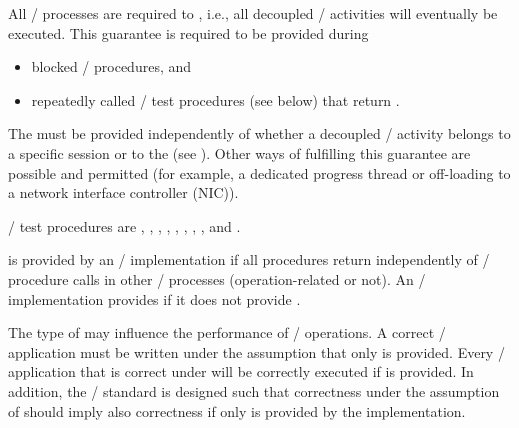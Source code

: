 
All \MPI/ processes are required to
,
i.e., all decoupled \MPI/ activities will eventually be executed.
This guarantee is required to be provided during
\begin{itemize}
\item blocked \MPI/ procedures, and
\item repeatedly called \MPI/ test procedures (see below) that return .
\end{itemize}

The  must be provided independently of whether a decoupled
\MPI/ activity belongs to a specific session or to the \wpm{}
(see  ).
Other ways of fulfilling this guarantee are possible and permitted
(for example, a dedicated progress thread or off-loading to a network interface controller (NIC)).

\MPI/ test procedures are
, , , ,
, , ,
, and .


is provided by an \MPI/ implementation if all  procedures return independently
of \MPI/ procedure calls in other \MPI/ processes (operation-related or not).
An \MPI/ implementation provides 
if it does not provide .


\begin{users}
The type of  may influence the performance of \MPI/ operations.
A correct \MPI/ application must be written under the assumption that
only  is provided.
Every \MPI/ application that is correct under  will be
correctly executed if  is provided.
In addition, the \MPI/ standard is designed such that correctness under
the assumption of  should imply also correctness if only
 is provided by the implementation.
\end{users}

